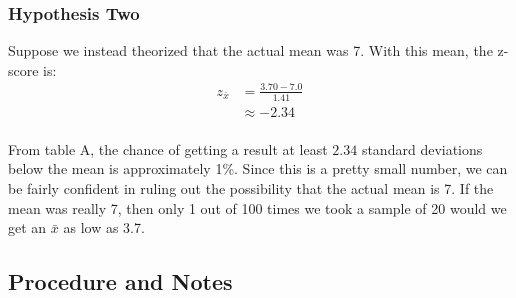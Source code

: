 \documentclass[letterpaper, landscape]{exam}
\begin{document}
  \subsubsection{Hypothesis Two}
  Suppose we instead theorized that the actual mean was 7. With this mean, the
  z-score is:
  \begin{align*}
    z_{\bar{x}} & = \frac{3.70 - 7.0}{1.41} \\
                & \approx -2.34 \\
  \end{align*}

  From table A, the chance of getting a result at least $2.34$ standard
  deviations below the mean is approximately 1\%. Since this is a pretty small
  number, we can be fairly confident in ruling out the possibility that the
  actual mean is 7. If the mean was really 7, then only 1 out of 100 times we
  took a sample of 20 would we get an $\bar{x}$ as low as 3.7.

  \subsection{Procedure and Notes}
\end{document}
